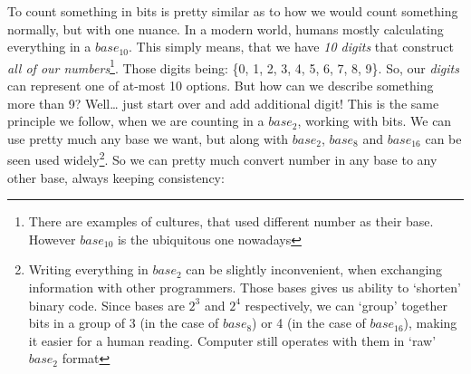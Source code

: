 \documentclass{article}
\begin{document}
            To count something in bits is pretty similar as to how we would count something normally, but with one nuance. In a modern world, humans mostly calculating 
            everything in a $base_{10}$. This simply means, that we have \emph{10 digits} that construct \emph{all of our numbers}\footnote{There are examples of cultures, that used different number as their base. However $base_{10}$ is the ubiquitous one nowadays}. 
            Those digits being: \{0, 1, 2, 3, 4, 5, 6, 7, 8, 9\}. So, our \emph{digits} can represent one of at-most 10 options. But how can we describe something more
            than 9? Well\ldots{} just start over and add additional digit! This is the same principle we follow, when we are counting in a $base_2$, working with bits.
            We can use pretty much any base we want, but along with $base_2$, $base_8$ and $base_{16}$ can be seen used widely\footnote{Writing everything in $base_2$
            can be slightly inconvenient, when exchanging information with other programmers. Those bases gives us ability to `shorten' binary code. Since bases
            are $2^3$ and $2^4$ respectively, we can `group' together bits in a group of 3 (in the case of $base_8$) or 4 (in the case of $base_{16}$), making it 
            easier for a human reading. Computer still operates with them in `raw' $base_2$ format}. So we can pretty much convert number in any base to any other 
            base, always keeping consistency:
\end{document}
